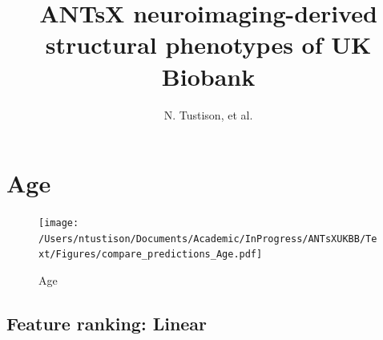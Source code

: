 \documentclass[
  10pt,
]{article}
\title{ANTsX neuroimaging-derived structural phenotypes of UK Biobank}
\author{N. Tustison, et al.}
\date{}
\begin{document}
\maketitle

{
\hypersetup{linkcolor=}
\setcounter{tocdepth}{2}
\tableofcontents
}
\clearpage

\hypertarget{age}{%
\section{Age}\label{age}}

\begin{figure}
\centering
\texttt{[image: /Users/ntustison/Documents/Academic/InProgress/ANTsXUKBB/Text/Figures/compare\_predictions\_Age.pdf]}
\caption{Age}
\end{figure}

\hypertarget{feature-ranking-linear}{%
\subsection{Feature ranking: Linear}\label{feature-ranking-linear}}
\end{document}

